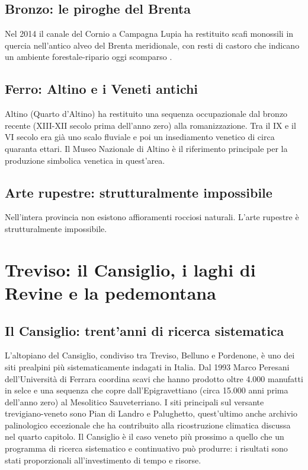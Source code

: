 \subsection{Bronzo: le piroghe del Brenta}

Nel 2014 il canale del Cornio a Campagna Lupia ha restituito scafi monossili in quercia nell'antico alveo del Brenta meridionale, con resti di castoro che indicano un ambiente forestale-ripario oggi scomparso \citep{asta2014}.

\subsection{Ferro: Altino e i Veneti antichi}

Altino (Quarto d'Altino) ha restituito una sequenza occupazionale dal bronzo recente (XIII-XII secolo prima dell'anno zero) alla romanizzazione. Tra il IX e il VI secolo era già uno scalo fluviale e poi un insediamento venetico di circa quaranta ettari. Il Museo Nazionale di Altino è il riferimento principale per la produzione simbolica venetica in quest'area.

\subsection{Arte rupestre: strutturalmente impossibile}

Nell'intera provincia non esistono affioramenti rocciosi naturali. L'arte rupestre è strutturalmente impossibile.

\section{Treviso: il Cansiglio, i laghi di Revine e la pedemontana}

\subsection{Il Cansiglio: trent'anni di ricerca sistematica}

L'altopiano del Cansiglio, condiviso tra Treviso, Belluno e Pordenone, è uno dei siti prealpini più sistematicamente indagati in Italia. Dal 1993 Marco Peresani dell'Università di Ferrara coordina scavi che hanno prodotto oltre 4.000 manufatti in selce e una sequenza che copre dall'Epigravettiano (circa 15.000 anni prima dell'anno zero) al Mesolitico Sauveterriano. I siti principali sul versante trevigiano-veneto sono Pian di Landro e Palughetto, quest'ultimo anche archivio palinologico eccezionale che ha contribuito alla ricostruzione climatica discussa nel quarto capitolo. Il Cansiglio è il caso veneto più prossimo a quello che un programma di ricerca sistematico e continuativo può produrre: i risultati sono stati proporzionali all'investimento di tempo e risorse.

